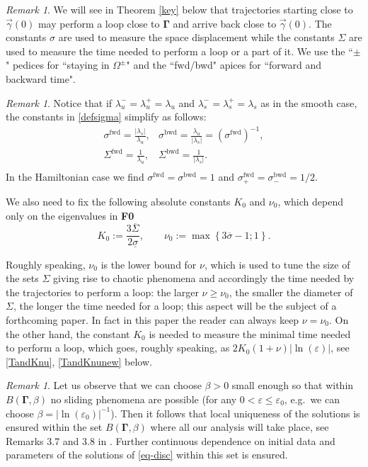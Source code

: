 \documentclass[10pt]{article}
\numberwithin{equation}{section}
\def\sbwd{\sigma^{\textrm{bwd}}}
\def\sfwd{\sigma^{\textrm{fwd}}}
\def\sbwd{\sigma^{\textrm{bwd}}}
\def\sTfwd{\Sigma^{\textrm{fwd}}}
\def\sTbwd{\Sigma^{\textrm{bwd}}}
\def\ga{\vec{\gamma}}
\def\ep{\varepsilon}
\def\la{\lambda}
\def\Om{\Omega}
\newcommand\bs[1]{{\boldsymbol{#1}}}
\newcommand\assump[1]{{\rm\textbf{#1}}}
\theoremstyle{definition}
\theoremstyle{remark}
\newtheorem{remark}[theorem]{Remark}
\begin{document}
\begin{remark}
We will see  in Theorem \ref{key} below that trajectories starting close to $\ga(0)$ may perform a loop close to $\bs{\Gamma}$  and arrive back
close to $\ga(0)$.
  The constants $\sigma$ are used to measure the space displacement while the constants $\Sigma$ are used to measure the
  time needed to perform a loop or a part of it. We use the ``$\pm$" pedices for ``staying in $\Om^{\pm}$" and the ``fwd/bwd" apices
  for ``forward and backward time".
\end{remark}

\begin{remark}\label{Ronconstants}
  Notice that if $\la_u^-=\la_u^+=\la_u$ and $\la_s^-=\la_s^+=\la_s$ as in the smooth case, the constants
  in \eqref{defsigma} simplify as follows:
  $$\begin{array}{cc}
      \sfwd= \frac{|\la_s|}{\la_u},   & \sbwd = \frac{\la_u}{|\la_s|}=(\sfwd)^{-1}, \\
      \sTfwd = \frac{1}{\la_u} , &  \sTbwd=\frac{1}{|\la_s|}. \\
    \end{array}   $$
    In the Hamiltonian case we find $\sfwd=\sbwd=1$ and $\sfwd_+=\sbwd_-=1/2$.
\end{remark}

We also need to fix the following absolute constants $K_0$ and $\nu_0$, which depend only on the eigenvalues in \assump{F0}
  \begin{equation}\label{defK0-new}
  K_0:=    \frac{3\overline{\Sigma} }{2  \underline{\sigma}} , \qquad  \nu_0:= \max \left\{  3\overline{\sigma}-1 ; 1   \right\}.
\end{equation}




Roughly speaking, $\nu_0$ is the lower bound for $\nu$, which is used to tune the size of the sets
$\Sigma$   giving rise
to chaotic phenomena and accordingly the time needed by the trajectories to perform a loop: the larger $\nu \ge \nu_0$, the smaller the
diameter
of
$\Sigma$, the longer the time needed for a loop; this aspect will be the subject of a forthcoming paper.
 In fact in this paper the reader can always keep  $\nu=\nu_0$.
On the other hand, the constant $K_0$ is needed  to measure  the minimal time needed to perform a loop, which  goes, roughly speaking,
as
$2K_0(1+\nu) |\ln(\ep)|$, see   \eqref{TandKnu}, \eqref{TandKnunew}  below.
\begin{remark}\label{data.smooth}
 Let us observe that we can choose $\beta>0$ small enough  so that within $B( \bs{\Gamma}, \beta)$ no sliding phenomena are possible (for any
$0<\ep \le \ep_0$, e.g.\ we can choose $\beta= |\ln(\ep_0)|^{-1}$). Then it follows that local uniqueness of the solutions is ensured within the set
$B( \bs{\Gamma}, \beta)$ where all our analysis will take place, see Remarks 3.7 and 3.8 in \cite{CFPRimut}. Further continuous
dependence on initial data and parameters     of the solutions of \eqref{eq-disc} within this set is ensured.
\end{remark}
\end{document}

